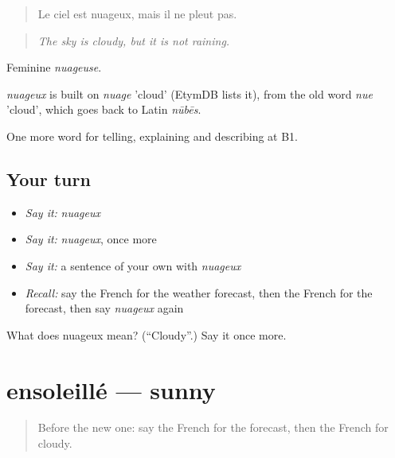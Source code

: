 \begin{quote}
Le ciel est nuageux, mais il ne pleut pas.
\end{quote}

\begin{quote}
\emph{The sky is cloudy, but it is not raining.}
\end{quote}

Feminine \emph{nuageuse}.

\begin{cousinweb}
\emph{nuageux} is built on \emph{nuage} 'cloud' (EtymDB lists it), from the old word \emph{nue} 'cloud', which goes back to Latin \emph{nūbēs}.
\end{cousinweb}

\begin{grammarlens}[title={What you've built}]
One more word for telling, explaining and describing at B1.
\end{grammarlens}

\subsection*{Your turn}
\begin{itemize}
\raggedright
  \item \emph{Say it:} \emph{nuageux}
  \item \emph{Say it:} \emph{nuageux}, once more
  \item \emph{Say it:} a sentence of your own with \emph{nuageux}
  \item \emph{Recall:} say the French for the weather forecast, then the French for the forecast, then say \emph{nuageux} again
\end{itemize}

\begin{tcolorbox}[breakable,colback=teal!4,colframe=teal!35!black,title={Before you move on}]
What does nuageux mean? (\textquotedblleft{}Cloudy\textquotedblright{}.) Say it once more.
\end{tcolorbox}
\section[ensoleillé]{ensoleillé — sunny}

\label{lesson:FR-C460-ensoleille}



\begin{quote}
Before the new one: say the French for the forecast, then the French for cloudy.
\end{quote}

